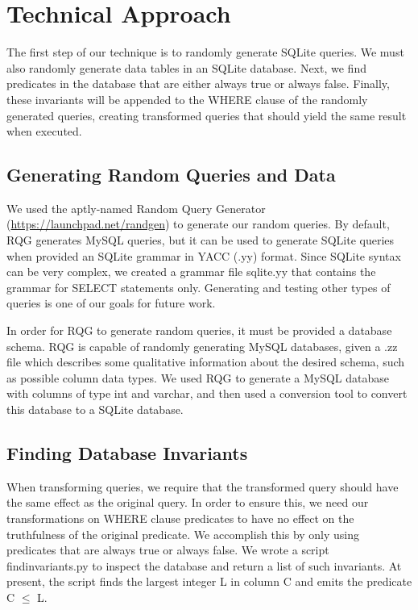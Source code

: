 \documentclass[conference]{acmsiggraph}
\begin{document}
\section{Technical Approach}

The first step of our technique is to randomly generate SQLite queries. We must also randomly generate data tables in an SQLite database. Next, we find predicates in the database that are either always true or always false. Finally, these invariants will be appended to the WHERE clause of the randomly generated queries, creating transformed queries that should yield the same result when executed.

\subsection{Generating Random Queries and Data}

We used the aptly-named Random Query Generator (\url{https://launchpad.net/randgen}) to generate our random queries. By default, RQG generates MySQL queries, but it can be used to generate SQLite queries when provided an SQLite grammar in YACC (.yy) format. Since SQLite syntax can be very complex, we created a grammar file sqlite.yy that contains the grammar for SELECT statements only. Generating and testing other types of queries is one of our goals for future work.

In order for RQG to generate random queries, it must be provided a database schema. RQG is capable of randomly generating MySQL databases, given a .zz file which describes some qualitative information about the desired schema, such as possible column data types. We used RQG to generate a MySQL database with columns of type int and varchar, and then used a conversion tool to convert this database to a SQLite database.

\subsection{Finding Database Invariants}

When transforming queries, we require that the transformed query should have the same effect as the original query. In order to ensure this, we need our transformations on WHERE clause predicates to have no effect on the truthfulness of the original predicate. We accomplish this by only using predicates that are always true or always false. We wrote a script findinvariants.py to inspect the database and return a list of such invariants. At present, the script finds the largest integer L in column C and emits the predicate C \(\leq\) L.
\end{document}
